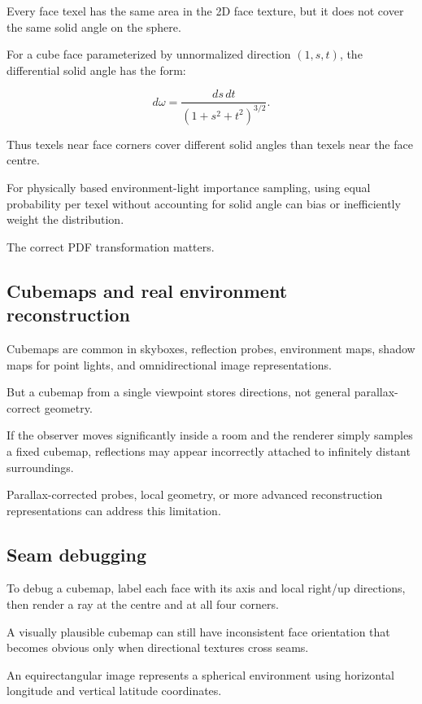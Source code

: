 Every face texel has the same area in the 2D face texture, but it does not cover the same solid angle on the sphere.

For a cube face parameterized by unnormalized direction \((1,s,t)\), the differential solid angle has the form:

\[ \boxed{ d\omega= \frac{ds\,dt} {(1+s^2+t^2)^{3/2}}. } \]

Thus texels near face corners cover different solid angles than texels near the face centre.

For physically based environment-light importance sampling, using equal probability per texel without accounting for solid angle can bias or inefficiently weight the distribution.

The correct PDF transformation matters.

\subsection{Cubemaps and real environment reconstruction}\label{02-foundations-ii-ch035-cubemaps-and-real-environment-reconstruction}

Cubemaps are common in skyboxes, reflection probes, environment maps, shadow maps for point lights, and omnidirectional image representations.

But a cubemap from a single viewpoint stores directions, not general parallax-correct geometry.

If the observer moves significantly inside a room and the renderer simply samples a fixed cubemap, reflections may appear incorrectly attached to infinitely distant surroundings.

Parallax-corrected probes, local geometry, or more advanced reconstruction representations can address this limitation.

\subsection{Seam debugging}\label{02-foundations-ii-ch035-seam-debugging}

To debug a cubemap, label each face with its axis and local right/up directions, then render a ray at the centre and at all four corners.

A visually plausible cubemap can still have inconsistent face orientation that becomes obvious only when directional textures cross seams.

An equirectangular image represents a spherical environment using horizontal longitude and vertical latitude coordinates.

